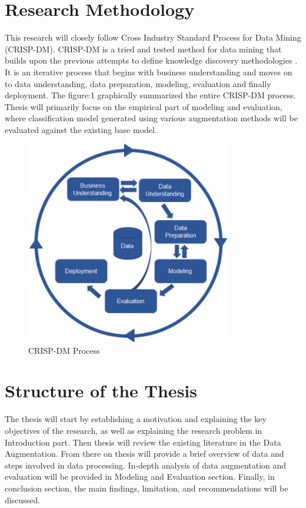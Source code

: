 \documentclass[12pt,a4paper,oneside,pdftex]{report}
\begin{document}
	\section{Research Methodology}
	
	This research will closely follow Cross Industry Standard Process for Data Mining (CRISP-DM). CRISP-DM is a tried and tested method for data mining that builds upon the previous attempts to define knowledge discovery methodologies \citep{wirth2000crisp}. It is an iterative process that begins with business understanding and moves on to data understanding, data preparation, modeling, evaluation and finally deployment. The figure:1 graphically summarized the entire CRISP-DM process. Thesis will primarily focus on the empirical part of modeling and evaluation, where classification model generated using various augmentation methods will be evaluated against the existing base model. 
	\begin{figure}[ht]
		\begin{center}
			\includegraphics[width=9cm]{images/crisp.png}
			\caption{CRISP-DM Process}
			\label{fig:CRISP-DM}
		\end{center}
	\end{figure}
	
	\section{Structure of the Thesis}
	\label{section:structure} 
	The thesis will start by establishing a motivation and explaining the key objectives of the research, as well as explaining the research problem in Introduction part. Then thesis will review the existing literature in the Data Augmentation. From there on thesis will provide a brief overview of data and steps involved in data processing. In-depth analysis of data augmentation and evaluation will be provided in Modeling and Evaluation section. Finally, in conclusion section, the main findings, limitation, and recommendations will be discussed. 
	
\end{document}
